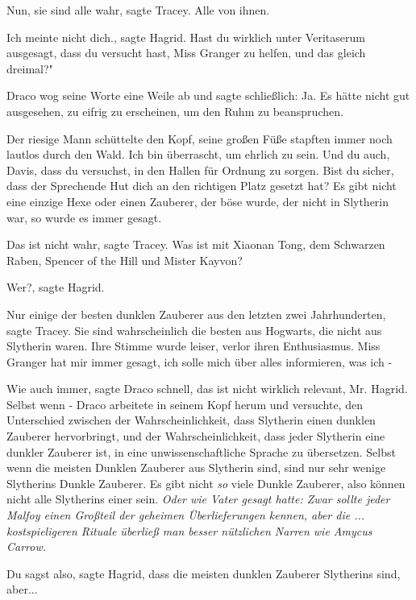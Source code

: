 \glqq{}Nun, sie sind alle wahr\grqq{}, sagte Tracey. \glqq{}Alle von ihnen.\grqq{}

\glqq{}Ich meinte nicht dich.\grqq{}, sagte Hagrid. \glqq{}Hast du wirklich unter
Veritaserum ausgesagt, dass du versucht hast, Miss Granger zu helfen, und
das gleich dreimal?"

Draco wog seine Worte eine Weile ab und sagte schließlich: \glqq{}Ja.\grqq{} Es
hätte nicht gut ausgesehen, zu eifrig zu erscheinen, um den Ruhm zu
beanspruchen.

Der riesige Mann schüttelte den Kopf, seine großen Füße stapften immer noch
lautlos durch den Wald. \glqq{}Ich bin überrascht, um ehrlich zu sein. Und
du auch, Davis, dass du versuchst, in den Hallen für Ordnung zu sorgen.
Bist du sicher, dass der Sprechende Hut dich an den richtigen Platz
gesetzt hat? Es gibt nicht eine einzige Hexe oder einen Zauberer, der
böse wurde, der nicht in Slytherin war, so wurde es immer gesagt.\grqq{}

\glqq{}Das ist nicht wahr\grqq{}, sagte Tracey. \glqq{}Was ist mit Xiaonan Tong,
dem Schwarzen Raben, Spencer of the Hill und Mister Kayvon?\grqq{}

\glqq{}Wer?\grqq{}, sagte Hagrid.

\glqq{}Nur einige der besten dunklen Zauberer aus den letzten zwei
Jahrhunderten\grqq{}, sagte Tracey. \glqq{}Sie sind wahrscheinlich die
besten aus Hogwarts, die nicht aus Slytherin waren.\grqq{} Ihre Stimme
wurde leiser, verlor ihren Enthusiasmus. \glqq{}Miss Granger hat mir immer
gesagt, ich solle mich über alles informieren, was ich -\grqq{}

\glqq{}Wie auch immer\grqq{}, sagte Draco schnell, \glqq{}das ist nicht wirklich
relevant, Mr. Hagrid. Selbst wenn -\grqq{} Draco arbeitete in seinem Kopf
herum und versuchte, den Unterschied zwischen der Wahrscheinlichkeit,
dass Slytherin einen dunklen Zauberer hervorbringt, und der
Wahrscheinlichkeit, dass jeder Slytherin eine dunkler Zauberer ist, in
eine unwissenschaftliche Sprache zu übersetzen. \glqq{}Selbst wenn die
meisten Dunklen Zauberer aus Slytherin sind, sind nur sehr wenige
Slytherins Dunkle Zauberer. Es gibt nicht \emph{so} viele Dunkle
Zauberer, also können nicht alle Slytherins einer sein.\grqq{} \emph{Oder
wie Vater gesagt hatte: Zwar sollte jeder Malfoy einen Großteil der
geheimen Überlieferungen kennen, aber die ... kostspieligeren Rituale
überließ man besser nützlichen Narren wie Amycus Carrow.}

\glqq{}Du sagst also\grqq{}, sagte Hagrid, \glqq{}dass die meisten dunklen
Zauberer Slytherins sind, aber...\grqq{}

